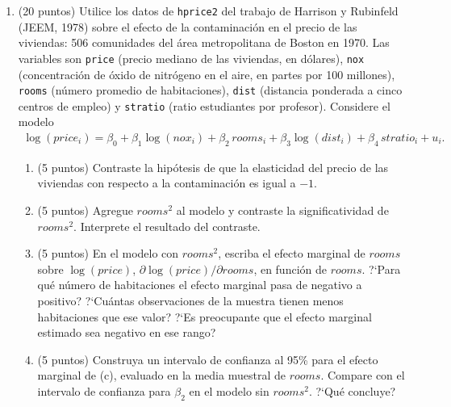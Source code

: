 \documentclass[letterpaper,11pt]{article}
\theoremstyle{plain}
\theoremstyle{definition}
\theoremstyle{remark}
\begin{document}
\begin{enumerate}
\item (20 puntos) Utilice los datos de \texttt{hprice2} del trabajo de Harrison y Rubinfeld
    (JEEM, 1978) sobre el efecto de la contaminaci\'on en el precio de las viviendas: 506
    comunidades del \'area metropolitana de Boston en 1970. Las variables son \texttt{price}
    (precio mediano de las viviendas, en d\'olares), \texttt{nox} (concentraci\'on de \'oxido de
    nitr\'ogeno en el aire, en partes por 100 millones), \texttt{rooms} (n\'umero promedio de
    habitaciones), \texttt{dist} (distancia ponderada a cinco centros de empleo) y
    \texttt{stratio} (ratio estudiantes por profesor). Considere el modelo
    \begin{align*}
    \log(price_i)=\beta_0+\beta_1 \log(nox_i)+\beta_2\, rooms_i +\beta_3 \log(dist_i) +\beta_4\, stratio_i +u_i.
    \end{align*}
    \begin{enumerate}
        \item (5 puntos) Contraste la hip\'otesis de que la elasticidad del precio de las
            viviendas con respecto a la contaminaci\'on es igual a $-1$.
        \item (5 puntos) Agregue $rooms^2$ al modelo y contraste la significatividad de
            $rooms^2$. Interprete el resultado del contraste.
        \item (5 puntos) En el modelo con $rooms^2$, escriba el efecto marginal de $rooms$
            sobre $\log(price)$, $\partial\log(price)/\partial rooms$, en funci\'on de $rooms$. ?`Para qu\'e
            n\'umero de habitaciones el efecto marginal pasa de negativo a positivo? ?`Cu\'antas
            observaciones de la muestra tienen menos habitaciones que ese valor? ?`Es
            preocupante que el efecto marginal estimado sea negativo en ese rango?
        \item (5 puntos) Construya un intervalo de confianza al 95\% para el efecto marginal
            de (c), evaluado en la media muestral de $rooms$. Compare con
            el intervalo de confianza para $\beta_2$ en el modelo sin $rooms^2$. ?`Qu\'e
            concluye?
    \end{enumerate}


\end{enumerate}
\end{document}
